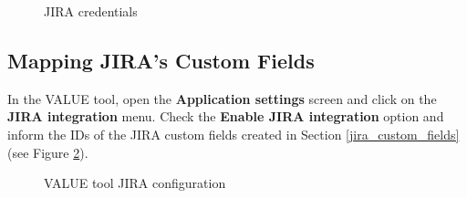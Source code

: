 \documentclass{article}
\begin{document}
\begin{figure}[!t]
    \centering
    \noindent{}
    \caption{JIRA credentials}
    \label{fig:value_env}
\end{figure}

\subsection{Mapping JIRA's Custom Fields}
In the VALUE tool, open the \textbf{Application settings} screen and click on the \textbf{JIRA integration} menu. Check the \textbf{Enable JIRA integration} option and inform the IDs of the JIRA custom fields created in Section \ref{jira_custom_fields} (see Figure \ref{fig:value_jira}).

\begin{figure}[!t]
    \centering
    \noindent{}
    \caption{VALUE tool JIRA configuration}
    \label{fig:value_jira}
\end{figure}
\end{document}
